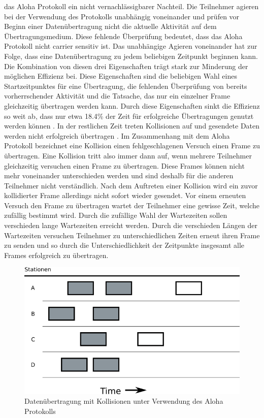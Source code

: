 das Aloha Protokoll ein nicht vernachlässigbarer Nachteil. Die Teilnehmer agieren bei der Verwendung des Protokolls unabhängig voneinander und prüfen vor Beginn einer Datenübertragung nicht die aktuelle Aktivität auf dem Übertragungsmedium. Diese fehlende Überprüfung bedeutet, dass das Aloha Protokoll nicht carrier sensitiv ist. Das unabhängige Agieren voneinander hat zur Folge, dass eine Datenübertragung zu jedem beliebigen Zeitpunkt beginnen kann. Die Kombination von diesen drei Eigenschaften trägt stark zur Minderung der möglichen Effizienz bei. Diese Eigenschaften sind die beliebigen Wahl eines Startzeitpunktes für eine Übertragung, die fehlenden Überprüfung von bereits vorherrschender Aktivität und die Tatsache, das nur ein einzelner Frame gleichzeitig übertragen werden kann. Durch diese Eigenschaften sinkt die Effizienz so weit ab, dass nur etwa 18.4\% der Zeit für erfolgreiche Übertragungen genutzt werden können \cite{Back_AlohaPure}. In der restlichen Zeit treten Kollisionen auf und gesendete Daten werden nicht erfolgreich übertragen \cite{Back_AlohaPure}. Im Zusammenhang mit dem Aloha Protokoll bezeichnet eine Kollision einen fehlgeschlagenen Versuch einen Frame zu übertragen. Eine Kollision tritt also immer dann auf, wenn mehrere Teilnehmer gleichzeitig versuchen einen Frame zu übertragen. Diese Frames können nicht mehr voneinander unterschieden werden und sind deshalb für die anderen Teilnehmer nicht verständlich. Nach dem Auftreten einer Kollision wird ein zuvor kollidierter Frame allerdings nicht sofort wieder gesendet. Vor einem erneuten Versuch den Frame zu übertragen wartet der Teilnehmer eine gewisse Zeit, welche zufällig bestimmt wird. Durch die zufällige Wahl der Wartezeiten sollen verschieden lange Wartezeiten erreicht werden. Durch die verschieden Längen der Wartezeiten versuchen Teilnehmer zu unterschiedlichen Zeiten erneut ihren Frame zu senden und so durch die Unterschiedlichkeit der Zeitpunkte insgesamt alle Frames erfolgreich zu übertragen.
\begin{figure}[h!]
	\centering
	\includegraphics[scale=0.6]{img/ZeichnungExport2.png}
	\caption{Datenübertragung mit Kollisionen unter Verwendung des Aloha Protokolls}
	\label{Abb2_PureAloha}
\end{figure}

